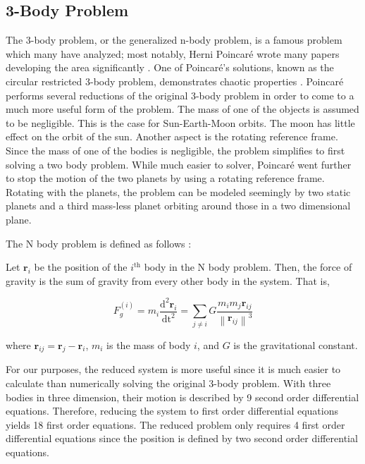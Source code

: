 \documentclass{article}
\begin{document}
\subsection{3-Body Problem}

The 3-body problem, or the generalized n-body problem, is a famous problem
which many have analyzed; most notably, Herni Poincaré wrote many papers
developing the area significantly \cite{chenciner2000remarkable}. One of
Poincaré's solutions, known as the circular restricted 3-body problem,
demonstrates chaotic properties \cite{oestreicher2007history}. Poincaré
performs several reductions of the original 3-body problem in order to come
to a much more useful form of the problem. The mass of one of the objects is
assumed to be negligible. This is the case for Sun-Earth-Moon orbits. The
moon has little effect on the orbit of the sun. Another aspect is the
rotating reference frame. Since the mass of one of the bodies is negligible,
the problem simplifies to first solving a two body problem. While much easier
to solver, Poincaré went further to stop the motion of the two planets by
using a rotating reference frame. Rotating with the planets, the problem can
be modeled seemingly by two static planets and a third mass-less planet
orbiting around those in a two dimensional plane.

\newcommand{\norm}[1]{\left\lVert#1\right\rVert}
\newcommand{\rv}{\mathbf{r}}

The N body problem is defined as follows \cite{chenciner2000remarkable}:

Let $\rv_i$ be the position of the $i^\text{th}$ body in the N body problem.
Then, the force of gravity is the sum of gravity from every other body in the
system. That is,

\begin{equation}
   F_g^{(i)} = m_i \frac{\mathrm{d}^2 \rv_i}{\mathrm{dt}^2} =
   \sum_{j \neq i} G \frac{m_i m_j \hat{\rv}_{ij}}{\norm{\rv_{ij}}^3}
   \label{eq:nbody}
\end{equation}

where $\rv_{ij} = \rv_j - \rv_i$, $m_i$ is the mass of body $i$, and $G$ is
the gravitational constant.

For our purposes, the reduced system is more useful since it is much easier
to calculate than numerically solving the original 3-body problem. With three
bodies in three dimension, their motion is described by 9 second order
differential equations. Therefore, reducing the system to first order
differential equations yields 18 first order equations. The reduced problem
only requires 4 first order differential equations since the position is
defined by two second order differential equations.
\end{document}
